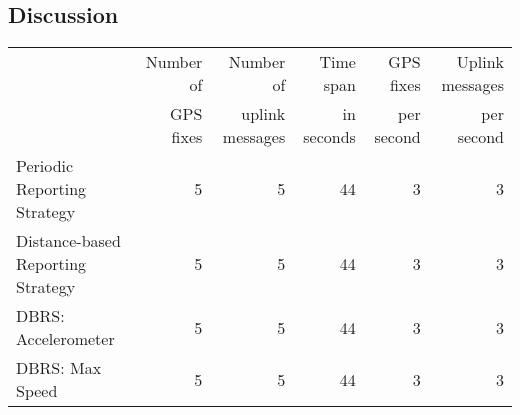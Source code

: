 \subsection{Discussion}

\begin{table*}[!h]
\begin{tabular}{lrrrrr}

& Number of & Number of & Time span & GPS fixes & Uplink messages \\

& GPS fixes & uplink messages & in seconds & per second & per second \\

\hline

Periodic Reporting Strategy & 5 & 5 & 44 & 3 & 3 \\

\hline

Distance-based Reporting Strategy & 5 & 5 & 44 & 3 & 3 \\

\hline

DBRS: Accelerometer & 5 & 5 & 44 & 3 & 3 \\

\hline

DBRS: Max Speed & 5 & 5 & 44 & 3 & 3 \\

\hline

\end{tabular}
\end{table*}